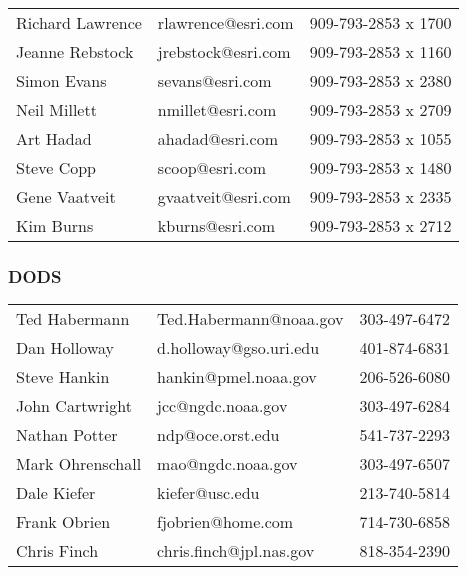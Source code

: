 \begin{center}
\begin{tabular}{lll} \\ 
Richard Lawrence &      rlawrence@esri.com &            909-793-2853 x 1700 \\
Jeanne Rebstock &       jrebstock@esri.com &            909-793-2853 x 1160 \\
Simon Evans &           sevans@esri.com &               909-793-2853 x 2380 \\
Neil Millett &          nmillet@esri.com &              909-793-2853 x 2709 \\
Art Hadad &             ahadad@esri.com &               909-793-2853 x 1055 \\
Steve Copp &            scoop@esri.com &                909-793-2853 x 1480 \\
Gene Vaatveit &         gvaatveit@esri.com &            909-793-2853 x 2335 \\
Kim Burns &             kburns@esri.com &               909-793-2853 x 2712 \\
\end{tabular}
\end{center}

\subsubsection{DODS}


\begin{center}
\begin{tabular}{lll} \\ 
Ted Habermann &         Ted.Habermann@noaa.gov &        303-497-6472 \\
Dan Holloway &  d.holloway@gso.uri.edu &        401-874-6831 \\
Steve Hankin &          hankin@pmel.noaa.gov &  206-526-6080 \\
John Cartwright &       jcc@ngdc.noaa.gov &             303-497-6284 \\
Nathan Potter &         ndp@oce.orst.edu        &       541-737-2293 \\
Mark Ohrenschall &      mao@ngdc.noaa.gov &             303-497-6507 \\
Dale Kiefer &           kiefer@usc.edu  &       213-740-5814 \\
Frank Obrien &          fjobrien@home.com       &       714-730-6858 \\
Chris Finch &           chris.finch@jpl.nas.gov & 818-354-2390 \\
\end{tabular}
\end{center}



